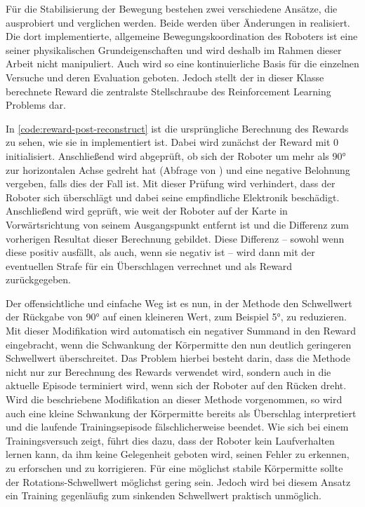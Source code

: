 Für die Stabilisierung der Bewegung bestehen zwei verschiedene Ansätze, die ausprobiert und verglichen werden.
Beide werden über Änderungen in  realisiert.
Die dort implementierte, allgemeine Bewegungskoordination des Roboters ist eine seiner physikalischen Grundeigenschaften und wird deshalb im Rahmen dieser Arbeit nicht manipuliert.
Auch wird so eine kontinuierliche Basis für die einzelnen Versuche und deren Evaluation geboten.
Jedoch stellt der in dieser Klasse berechnete Reward die zentralste Stellschraube des Reinforcement Learning Problems dar.

\begin{figure}
    
\end{figure}

In \autoref{code:reward-post-reconstruct} ist die ursprüngliche Berechnung des Rewards zu sehen, wie sie in  implementiert ist.
Dabei wird zunächst der Reward mit 0 initialisiert.
Anschließend wird abgeprüft, ob sich der Roboter um mehr als 90° zur horizontalen Achse gedreht hat (Abfrage von ) und eine negative Belohnung vergeben, falls dies der Fall ist.
Mit dieser Prüfung wird verhindert, dass der Roboter sich überschlägt und dabei seine empfindliche Elektronik beschädigt.
Anschließend wird geprüft, wie weit der Roboter auf der Karte in Vorwärtsrichtung von seinem Ausgangspunkt entfernt ist und die Differenz zum vorherigen Resultat dieser Berechnung gebildet.
Diese Differenz -- sowohl wenn diese positiv ausfällt, als auch, wenn sie negativ ist -- wird dann mit der eventuellen Strafe für ein Überschlagen verrechnet und als Reward zurückgegeben.

Der offensichtliche und einfache Weg ist es nun, in der Methode  den Schwellwert der Rückgabe von 90° auf einen kleineren Wert, zum Beispiel 5°, zu reduzieren.
Mit dieser Modifikation wird automatisch ein negativer Summand in den Reward eingebracht, wenn die Schwankung der Körpermitte den nun deutlich geringeren Schwellwert überschreitet.
Das Problem hierbei besteht darin, dass die Methode  nicht nur zur Berechnung des Rewards verwendet wird, sondern auch in  die aktuelle Episode terminiert wird, wenn sich der Roboter auf den Rücken dreht.
Wird die beschriebene Modifikation an dieser Methode vorgenommen, so wird auch eine kleine Schwankung der Körpermitte bereits als Überschlag interpretiert und die laufende Trainingsepisode fälschlicherweise beendet.
Wie sich bei einem Trainingsversuch zeigt, führt dies dazu, dass der Roboter kein Laufverhalten lernen kann, da ihm keine Gelegenheit geboten wird, seinen Fehler zu erkennen, zu erforschen und zu korrigieren.
Für eine möglichst stabile Körpermitte sollte der Rotations-Schwellwert möglichst gering sein.
Jedoch wird bei diesem Ansatz ein Training gegenläufig zum sinkenden Schwellwert praktisch unmöglich.

